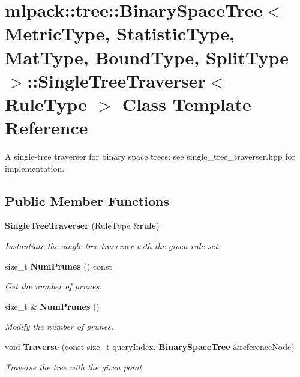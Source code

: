 \section{mlpack\+:\+:tree\+:\+:Binary\+Space\+Tree$<$ Metric\+Type, Statistic\+Type, Mat\+Type, Bound\+Type, Split\+Type $>$\+:\+:Single\+Tree\+Traverser$<$ Rule\+Type $>$ Class Template Reference}
\label{classmlpack_1_1tree_1_1BinarySpaceTree_1_1SingleTreeTraverser}


A single-\/tree traverser for binary space trees; see single\+\_\+tree\+\_\+traverser.\+hpp for implementation.  


\subsection*{Public Member Functions}
\begin{DoxyCompactItemize}
\item 
{\bf Single\+Tree\+Traverser} (Rule\+Type \&{\bf rule})
\begin{DoxyCompactList}\small\item\em Instantiate the single tree traverser with the given rule set. \end{DoxyCompactList}\item 
size\+\_\+t {\bf Num\+Prunes} () const 
\begin{DoxyCompactList}\small\item\em Get the number of prunes. \end{DoxyCompactList}\item 
size\+\_\+t \& {\bf Num\+Prunes} ()
\begin{DoxyCompactList}\small\item\em Modify the number of prunes. \end{DoxyCompactList}\item 
void {\bf Traverse} (const size\+\_\+t query\+Index, {\bf Binary\+Space\+Tree} \&reference\+Node)
\begin{DoxyCompactList}\small\item\em Traverse the tree with the given point. \end{DoxyCompactList}\end{DoxyCompactItemize}

